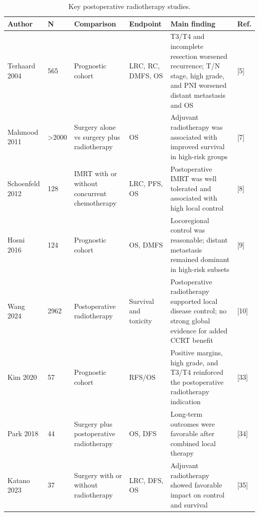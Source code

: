 \documentclass[10pt,twocolumn]{article}
\begin{document}
\begin{table}[t]
\centering
\caption{Key postoperative radiotherapy studies.}
\label{tab:4}
\scriptsize
\setlength{\tabcolsep}{3pt}
\renewcommand{\arraystretch}{0.9}
\begin{tabular}{p{}p{}p{}p{}p{}p{}}
\toprule
Author & N & Comparison & Endpoint & Main finding & Ref. \\
\midrule
Terhaard 2004 & 565 & Prognostic cohort & LRC, RC, DMFS, OS & T3/T4 and incomplete resection worsened recurrence; T/N stage, high grade, and PNI worsened distant metastasis and OS & [5] \\
Mahmood 2011 & >2000 & Surgery alone vs surgery plus radiotherapy & OS & Adjuvant radiotherapy was associated with improved survival in high-risk groups & [7] \\
Schoenfeld 2012 & 128 & IMRT with or without concurrent chemotherapy & LRC, PFS, OS & Postoperative IMRT was well tolerated and associated with high local control & [8] \\
Hosni 2016 & 124 & Prognostic cohort & OS, DMFS & Locoregional control was reasonable; distant metastasis remained dominant in high-risk subsets & [9] \\
Wang 2024 & 2962 & Postoperative radiotherapy & Survival and toxicity & Postoperative radiotherapy supported local disease control; no strong global evidence for added CCRT benefit & [10] \\
Kim 2020 & 57 & Prognostic cohort & RFS/OS & Positive margins, high grade, and T3/T4 reinforced the postoperative radiotherapy indication & [33] \\
Park 2018 & 44 & Surgery plus postoperative radiotherapy & OS, DFS & Long-term outcomes were favorable after combined local therapy & [34] \\
Katano 2023 & 37 & Surgery with or without radiotherapy & LRC, DFS, OS & Adjuvant radiotherapy showed favorable impact on control and survival & [35] \\
\bottomrule
\end{tabular}
\end{table}
\end{document}
